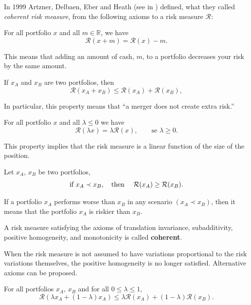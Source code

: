 In 1999 Artzner, Delbaen, Eber and Heath (see in \cite{Artzner1999}) defined, what they called \textit{coherent risk measure}, from the following axioms to a risk measure $\mathcal{R}$:

\begin{axiom} For all portfolio $x$ and all $m\in\mathbb{R}$,  we have
	\[
		\mathcal{R}(x+m) = \mathcal{R}(x)-m.
	\]
\end{axiom}
This means that adding an amount of cash, $m$, to a portfolio decreases your risk by the same amount.

\begin{axiom}[Subadditivity] If $x_A$ and $x_B$ are two portfolios, then
	\[
		\mathcal{R}(x_A+x_B) \leq \mathcal{R}(x_A) + \mathcal{R}(x_B),
	\]
\end{axiom}
In particular, this property means that ``a merger does not create extra risk.''

\begin{axiom} For all portfolio $x$ and all $\lambda\leq 0$ we have
	\[
		\mathcal{R}(\lambda x) = \lambda \mathcal{R}(x), \qquad \mbox{se } \lambda
		\geq 0.
	\]
\end{axiom}
This property implies that the risk measure is a linear function of the size of the position.

\begin{axiom}[Monotonicity] Let $x_A$, $x_B$ be two portfolios,
	\[
		\mbox{if } x_A \prec x_B, \quad \mbox{then } \quad \mathcal{R}(x_A) \geq \mathcal{R}(x_B).\\
	\]
\end{axiom}
If a portfolio $x_A$ performs worse than $x_B$ in any
scenario $(x_A \prec x_B)$, then it means that the portfolio $x_A$ is
riskier than $x_B$.

\begin{definition}
	A risk measure satisfying the axioms of translation invariance, subadditivity, positive homogeneity, and monotonicity is called \textbf{coherent}.
\end{definition}


When the risk measure is not assumed to have variations proportional to the risk variations themselves, the positive homogeneity is no longer satisfied. Alternative axioms can be proposed.

\begin{axiom}[Convexity] For all portfolios $x_A$, $x_B$ and for all $0\leq \lambda \leq 1$,
	\[
		\mathcal{R}(\lambda x_A + (1-\lambda)x_A) \leq \lambda \mathcal{R}(x_A) + (1-\lambda) \mathcal{R}(x_B).
	\]
\end{axiom}

